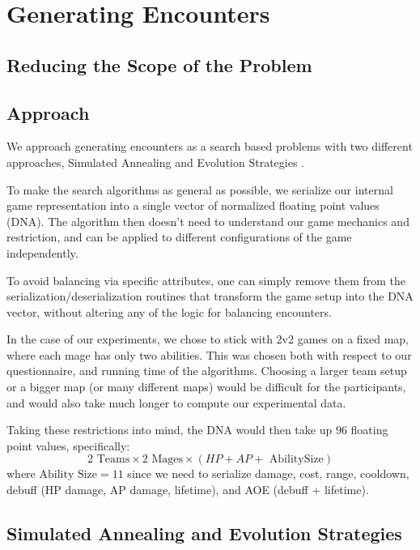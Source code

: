 \chapter{Generating Encounters}
\label{chapter04}

\section{Reducing the Scope of the Problem}


\section{Approach}

We approach generating encounters as a search based problems with two different
approaches, Simulated Annealing \citep{ai-modern} and Evolution Strategies
\citep{evolution-strategies}.

To make the search algorithms as general as possible, we serialize our
internal game representation into a single vector of normalized floating
point values (DNA). The algorithm then doesn't need to understand our game
mechanics and restriction, and can be applied to different configurations of
the game independently.

To avoid balancing via specific attributes, one can simply remove them from
the serialization/deserialization routines that transform the game setup into
the DNA vector, without altering any of the logic for balancing encounters.

In the case of our experiments, we chose to stick with 2v2 games on a fixed map,
where each mage has only two abilities. This was chosen both with respect to our
questionnaire, and running time of the algorithms. Choosing a larger team setup or
a bigger map (or many different maps) would be difficult for the participants,
and would also take much longer to compute our experimental data.

Taking these restrictions into mind, the DNA would then take up $96$ floating point values,
specifically: $$2 \text{ Teams} \times 2 \text{ Mages} \times ( HP + AP + \text{ AbilitySize})$$ where $\text{Ability Size} = 11$ since we need to serialize damage, cost, range, cooldown,
debuff (HP damage, AP damage, lifetime), and AOE (debuff + lifetime).

\section{Simulated Annealing and Evolution Strategies}

